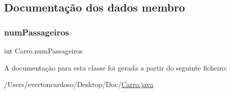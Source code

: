 \subsection{Documentação dos dados membro}
\mbox{\label{class_carro_a078d618deb133f1bd65f421c10c77507}} 
\subsubsection{\texorpdfstring{num\+Passageiros}{numPassageiros}}
{\footnotesize\ttfamily int Carro.\+num\+Passageiros\hspace{0.3cm}{\ttfamily [protected]}}



A documentação para esta classe foi gerada a partir do seguinte ficheiro\+:\begin{DoxyCompactItemize}
\item 
/\+Users/evertoncardoso/\+Desktop/\+Doc/\mbox{\hyperlink{_carro_8java}{Carro.\+java}}\end{DoxyCompactItemize}
